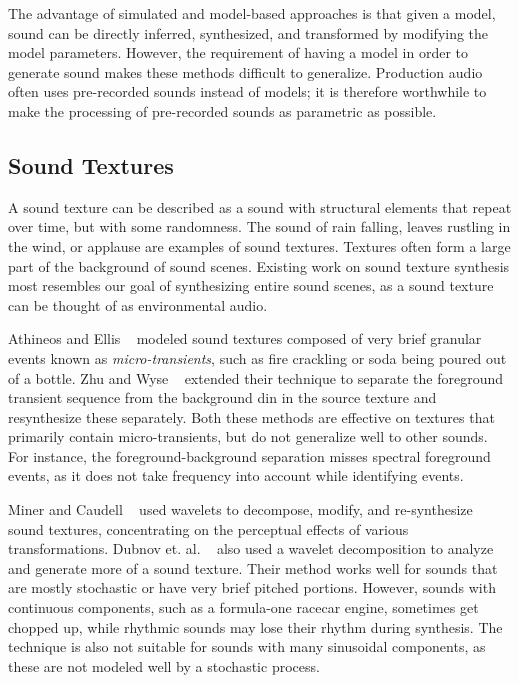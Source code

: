 \documentclass[review]{acmsiggraph}      %
\begin{document}
The advantage of simulated and model-based approaches is that given a model, sound can be
directly inferred, synthesized, and transformed by modifying the model parameters. 
However, the requirement of having a model in order to generate sound  makes these methods 
difficult to generalize. Production audio often uses pre-recorded sounds instead of models; it is therefore worthwhile to make the processing of pre-recorded sounds as parametric as possible. 


\subsection{Sound Textures}

A sound texture can be described as a sound with structural elements 
that repeat over time, but with some randomness. The sound of rain falling, 
leaves rustling in the wind, or applause are examples of sound textures. 
Textures often form a large part of the background of sound scenes.
Existing work on sound texture synthesis most resembles our goal of synthesizing
entire sound scenes, as a sound texture can be thought of as environmental audio.

Athineos and Ellis ~ modeled sound textures composed of
very brief granular events known as \textit{micro-transients}, such as 
fire crackling or soda being poured out of a bottle. 
Zhu and Wyse ~ extended their technique to separate 
the foreground transient sequence from the background din in the source 
texture and resynthesize these separately. Both these methods are effective on textures 
that primarily contain micro-transients, but do not generalize well to other sounds. For 
instance, the foreground-background separation misses spectral foreground events, as it does 
not take frequency into account while identifying events.

Miner and Caudell ~ used wavelets to decompose, 
modify, and re-synthesize sound textures, concentrating 
on the perceptual effects of various transformations. 
Dubnov et. al. ~ also used a wavelet decomposition to 
analyze and generate more of a sound texture. 
Their method works well for sounds that are mostly 
stochastic or have very brief pitched portions. However, sounds with 
continuous components, such as a formula-one racecar engine, sometimes 
get chopped up, while rhythmic sounds may lose their rhythm during 
synthesis. The technique is also not suitable for sounds with 
many sinusoidal components, as these are not modeled well by a 
stochastic process.
 
\end{document}
